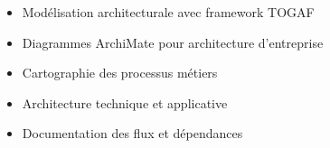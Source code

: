 \documentclass[10pt,a4paper,normalphoto]{altacv}
\begin{document}
\divider

\begin{itemize}
\item Modélisation architecturale avec framework TOGAF
\item Diagrammes ArchiMate pour architecture d'entreprise
\item Cartographie des processus métiers
\item Architecture technique et applicative
\item Documentation des flux et dépendances
\end{itemize}
\end{document}
